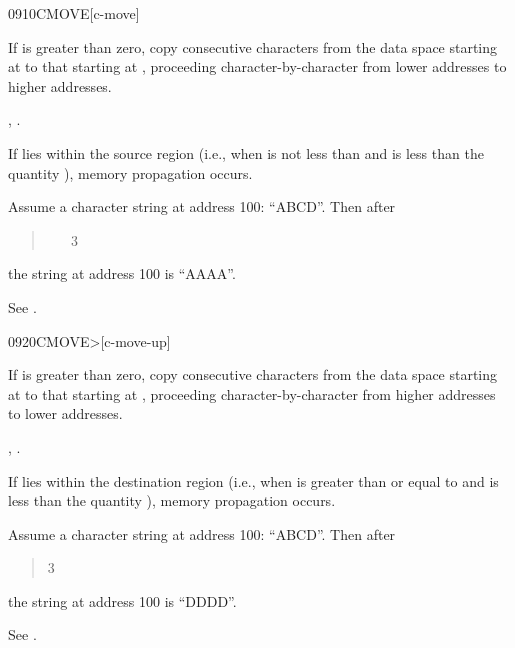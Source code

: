 \begin{worddef}{0910}{CMOVE}[c-move]
\item {}

	If  is greater than zero, copy  consecutive
	characters from the data space starting at  to
	that starting at , proceeding character-by-character
	from lower addresses to higher addresses.

\see {}, .

	\begin{rationale} %
		If  lies within the source region (i.e., when
		 is not less than  and
		 is less than the quantity 
		 \word[core]{+}), memory propagation occurs.

		Assume a character string at address
		100: ``ABCD''. Then after

		\begin{quote}  ~  ~ 3 
		\end{quote}

		the string at address 100 is ``AAAA''.

		See .
	\end{rationale}
\end{worddef}

\pagebreak
\begin{worddef}[CMOVEtop]{0920}{CMOVE>}[c-move-up]
\item {}

	If  is greater than zero, copy  consecutive
	characters from the data space starting at  to
	that starting at , proceeding character-by-character
	from higher addresses to lower addresses.

\see {}, .

	\begin{rationale} %
		If  lies within the destination region (i.e.,
		when  is greater than or equal to
		 and  is less than the
		quantity  
		\word[core]{+}), memory propagation	occurs.

		Assume a character string at address
		100: ``ABCD''. Then after

		\begin{quote}   
			3 
		\end{quote}

		the string at address 100 is ``DDDD''.

		See .
		\pagebreak
	\end{rationale}
\end{worddef}


